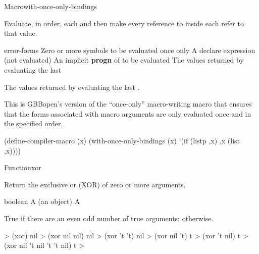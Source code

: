 \documentclass[10pt,twoside,english,pdftex]{article}
\begin{document}
\begin{functiondoc}{Macro}{with-once-only-bindings}{%
    }

\fnsyntax

\fnpurpose Evaluate, in order, each  and then make every
reference to  inside each  refer to that
value.

\fnpackage {}

\fnmodule {}

\fnargs
\begin{args}{error-forms}
\arg[symbols] Zero or more symbols to be evaluated once only
\arg[declaration] A declare expression (not evaluated)
\arg[forms] An implicit \textbf{progn} of  to be evaluated
\arg[results] The values returned by evaluating the last 
\end{args}

\fnreturns The values returned by evaluating the last .

\fndescription This is GBBopen's version of the ``once-only'' macro-writing
macro that ensures that the forms associated with macro arguments are
only evaluated once and in the specified order.

%
\fnexample
%
\W\supp
\begin{example}
  (define-compiler-macro  (x)
    (with-once-only-bindings (x)
      `(if (listp ,x) ,x (list ,x))))
\end{example}

\end{functiondoc}


\begin{functiondoc}{Function}{xor}{
    }

\fnsyntax

\fnpurpose Return the exclusive or (XOR) of zero or more arguments.

\fnpackage {}

\fnmodule {}

\fnargs
\begin{args}{boolean}
\arg[arg] A  (an object)
\arg[boolean] A 
\end{args}

\fnreturns True if there are an even odd number of true arguments; \nil{}
otherwise.

\fnexamples
%
\W\supp
\begin{example}
  > (xor)
  nil
  > (xor nil nil)
  nil
  > (xor 't 't)
  nil\goodpagebreak
  > (xor nil 't)
  t
  > (xor 't nil)
  t
  > (xor nil 't nil 't 't nil)
  t
  >
\end{example}

\end{functiondoc}
\end{document}
